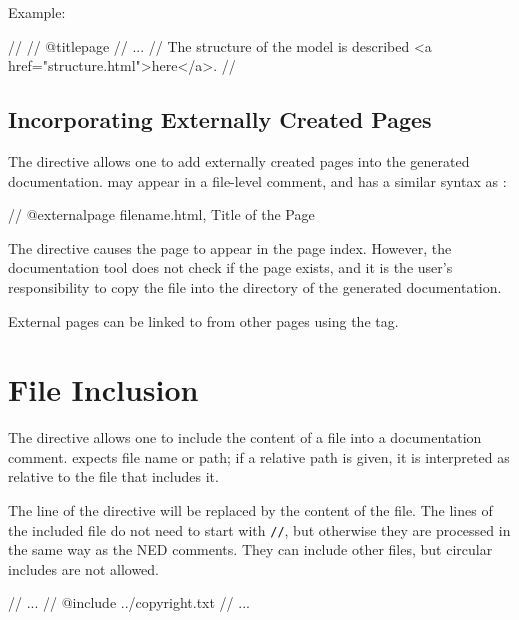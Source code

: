 Example:
\begin{ned}
//
// @titlepage
// ...
// The structure of the model is described <a href="structure.html">here</a>.
//
\end{ned}


\subsection{Incorporating Externally Created Pages}
\label{sec:neddoc:externally-created-pages}

The  directive allows one to add externally created
pages into the generated documentation.  may appear
in a file-level comment, and has a similar syntax as :

\begin{ned}
// @externalpage filename.html, Title of the Page
\end{ned}

The directive causes the page to appear in the page index. However, the
documentation tool does not check if the page exists, and it is the user's
responsibility to copy the file into the directory of the generated
documentation.

External pages can be linked to from other pages using the  tag.


\section{File Inclusion}
\label{sec:neddoc:file-inclusion}

The  directive allows one to include the content of a file
into a documentation comment.  expects file name or path; if
a relative path is given, it is interpreted as relative to the file that
includes it.

The line of the  directive will be replaced by the
content of the file. The lines of the included file do not need
to start with \texttt{//}, but otherwise they are processed in the same way
as the NED comments. They can include other files, but circular
includes are not allowed.

\begin{ned}
// ...
// @include ../copyright.txt
// ...
\end{ned}

